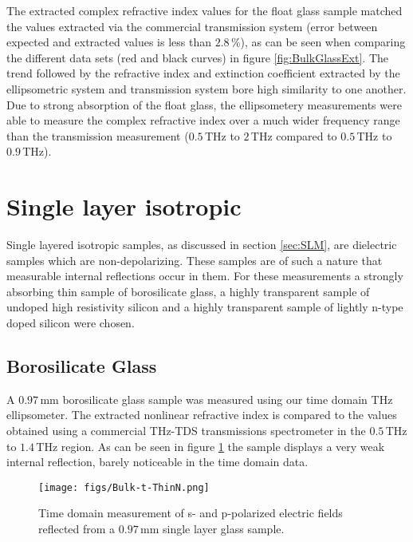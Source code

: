The extracted complex refractive index values for the float glass sample matched the values extracted via the commercial transmission system (error between expected and extracted values is less than $2.8\,\%$), as can be seen when comparing the different data sets (red and black curves) in figure \ref{fig:BulkGlassExt}. The trend followed by the refractive index and extinction coefficient extracted by the ellipsometric system and transmission system bore high similarity to one another.  Due to strong absorption of the float glass, the ellipsometery measurements were able to measure the complex refractive index over a much wider frequency range than the transmission measurement ($0.5\,$THz to $2\,$THz compared to $0.5\,$THz to $0.9\,$THz).


\section{Single layer isotropic}
\label{sec: Single_res}

Single layered isotropic samples, as discussed in section \ref{sec:SLM}, are dielectric samples which are non-depolarizing. These samples are of such a nature that measurable internal reflections occur in them. For these measurements a strongly absorbing thin sample of borosilicate glass, a highly transparent sample of undoped high resistivity silicon and a highly transparent sample of lightly n-type doped silicon were chosen.

\subsection{Borosilicate Glass}
\label{sub: glass}

A $0.97\,$mm borosilicate glass sample was measured using our time domain THz ellipsometer. The extracted nonlinear refractive index is compared to the values obtained using a commercial THz-TDS transmissions spectrometer in the $0.5\,$THz to $1.4\,$THz region. As can be seen in figure \ref{fig:GlassSingleE0t} the sample displays a very weak internal reflection, barely noticeable in the time domain data.

\begin{figure}[H]
\begin{center}
\texttt{[image: figs/Bulk-t-ThinN.png]}
\end{center}
\caption[Time-domain measurement: Single layer glass, focused on pulse and internal reflection]{\label{fig:GlassSingleE0t} Time domain measurement of s- and p-polarized electric fields reflected from a $0.97\,$mm single layer glass sample.}
\end{figure}

